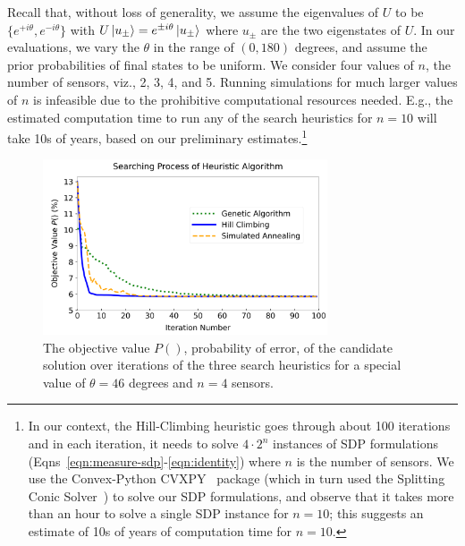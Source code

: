Recall that, without loss of generality, we assume the eigenvalues of 
$U$ to be $\{e^{+i\theta}, e^{-i\theta}\}$ with $U\ket{u_{\pm}}=e^{\pm i\theta}\ket{u_{\pm}}$ where $u_{\pm}$ are the
two eigenstates of $U$.
In our evaluations, we vary the $\theta$ in the range of $(0, 180)$ degrees, and
assume the prior probabilities of final states to be uniform. We consider four values of $n$, the number of sensors, viz., 2, 3, 4, and 5. Running simulations for much larger values of $n$ is infeasible due to the prohibitive computational resources needed. 
E.g., the estimated computation time to run any of the search 
heuristics for $n=10$ will take 10s of years, based on our 
preliminary 
estimates.\footnote{In our context, the Hill-Climbing heuristic goes through about 100
iterations and in each iteration, it needs to solve $4\cdot2^n$ instances of SDP formulations 
(Eqns~\ref{eqn:measure-sdp}-\ref{eqn:identity}) where $n$ is the number of sensors. 
We use the Convex-Python CVXPY~\cite{diamond2016cvxpy} package
(which in turn used the Splitting Conic Solver~\cite{sdp-solver}) to solve our SDP formulations, and observe that it takes more than an hour to 
solve a single SDP instance for $n=10$; this suggests an estimate of 10s of years of computation time for $n=10$.}


\begin{figure}
    \centering
    \includegraphics[width=0.75\textwidth]{chapters/tqc/figures/compare_methods_similar.png}
    \caption{The objective value $P()$, probability of error, of the candidate solution over iterations of the 
    three search heuristics for a special value of $\theta =46$ degrees and $n = 4$ sensors.}
    \label{fig:iterations}
\end{figure}



